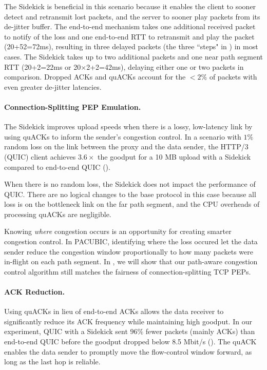 The Sidekick is beneficial in this scenario because it enables the client to sooner
detect and retransmit lost packets, and the server to sooner play packets from
its de-jitter buffer.
The end-to-end mechanism takes one additional received packet to notify of the
loss and
one end-to-end RTT to retransmit and play the packet (20+52=72ms), resulting in
three delayed packets (the three ``steps" in ) in most cases.
The Sidekick takes up to two additional packets and one near path segment RTT
(20+2=22ms or 20$\times$2+2=42ms), delaying either one or two packets in comparison.
Dropped ACKs and quACKs account for the $<2\%$ of packets with even greater
de-jitter latencies.

\paragraph{Connection-Splitting PEP Emulation.}
The Sidekick improves upload speeds when there is a lossy, low-latency link
by using quACKs to inform the sender's congestion control.
In a scenario with $1\%$ random loss on the link between the proxy and the
data sender, the HTTP/3 (QUIC) client achieves $3.6\times$ the goodput for a 10 MB
upload with a Sidekick compared to end-to-end QUIC ().

When there is no random loss, the Sidekick does not impact the performance
of QUIC\@.
There are no logical changes to the base protocol in this case because all loss
is on the
bottleneck link on the far path segment, and the CPU overheads of processing quACKs
are negligible.

Knowing \emph{where} congestion occurs is an opportunity for creating smarter
congestion control. In PACUBIC, identifying where the loss occured let the data
sender reduce the congestion window proportionally to how many packets were
in-flight on each path segment. In , we
will show that our path-aware congestion control algorithm still matches the
fairness of connection-splitting TCP PEPs.

\paragraph{ACK Reduction.}

Using quACKs in lieu of end-to-end ACKs allows the data receiver to
significantly reduce its ACK frequency while maintaining high goodput.
In our experiment, QUIC with a Sidekick sent $96\%$ fewer packets (mainly ACKs)
than end-to-end QUIC before the goodput dropped below 8.5 Mbit/s
().
The quACK enables the data sender to promptly move the flow-control window forward,
as long as the last hop is reliable.

